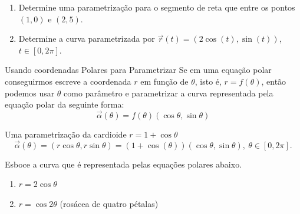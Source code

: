 \begin{frame}[label=fun-vet]
	\begin{casa}
		\begin{enumerate}
			\item  Determine uma parametrização para o segmento de reta que entre os pontos $(1,0)$ e $(2,5)$.
			\item Determine a curva parametrizada por $\vec{r}(t)=(2\cos(t),\sin(t))$, $t\in [0,2\pi]$.
		\end{enumerate}
	\end{casa}
\end{frame}




\begin{frame}[label=fun-vet]{Usando coordenadas Polares para Parametrizar}
Se em uma equação polar conseguirmos escreve a coordenada $r$ em função de $\theta$, isto é, $r=f(\theta)$, então podemos usar $\theta$ como parâmetro e parametrizar a curva representada pela equação polar da seguinte forma:
\[\vec{\alpha}(\theta)=f(\theta)(\cos \theta,\sin \theta)\]

\begin{exe}
Uma parametrização da cardioide $r=1+\cos \theta$ 
\[\vec{\alpha}(\theta)=(r\cos \theta,r\sin \theta)=(1+\cos (\theta))(\cos \theta,\sin \theta),\ \theta\in [0,2\pi].\]

\end{exe}
\end{frame}

\begin{frame}[label=fun-vet]
	\begin{casa}
		
		Esboce a curva que é representada pelas equações polares abaixo.
\begin{enumerate}
\item $r=2\cos\theta$
	
\item $r=\cos 2\theta$ (rosácea de quatro pétalas)
\end{enumerate}
	\end{casa}
\end{frame}


%	




